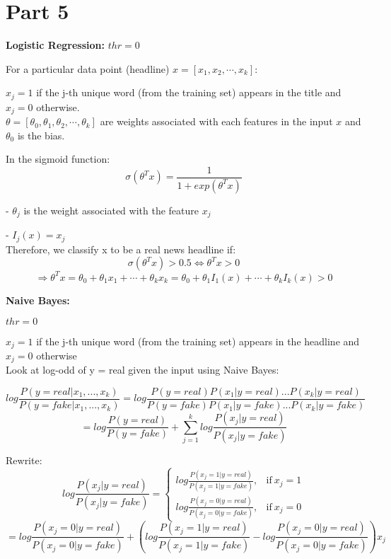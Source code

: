 \documentclass{article}
\begin{document}
\section*{Part 5}
\textbf{Logistic Regression:
}
\noindent
$thr = 0$

\noindent
For a particular data point (headline) $x = [x_1, x_2, \cdots, x_k]$:

\noindent
$x_j = 1$ if the j-th unique word (from the training set) appears in the title and $x_j = 0$ otherwise.\\

\noindent
$\theta =[\theta_0, \theta_1, \theta_2, \cdots, \theta_k]$ are weights associated with each features in the input $x$ and $\theta_0$ is the bias. 

\noindent
In the sigmoid function: $$\sigma(\theta^T x) = \frac{1}{1+exp(\theta^T x)}$$

- $\theta_j$ is the weight associated with the feature $x_j$

- $I_{j}(x) = x_j$ \\

\noindent
Therefore, we classify x to be a real news headline if:
$$\sigma(\theta^T x) > 0.5 \Leftrightarrow \theta^T x > 0$$
$$\Rightarrow \theta^T x = \theta_0 + \theta_1 x_1 + \cdots + \theta_k x_k = \theta_0 + \theta_1 I_{1}(x) + \cdots + \theta_k I_{k}(x) > 0$$

\noindent
\textbf{Naive Bayes:
}

\noindent
$thr = 0$

\noindent
$x_j = 1$ if the j-th unique word (from the training set) appears in the headline and $x_j = 0$ otherwise\\

\noindent
Look at log-odd of y = real given the input using Naive Bayes:

$$log\frac{P(y=real|x_1, ... , x_k)}{P(y=fake|x_1, ... , x_k)} = log\frac{P(y=real)P(x_1|y = real)...P(x_k|y = real)}{P(y=fake)P(x_1|y = fake)...P(x_k|y = fake)}$$
$$= log\frac{P(y=real)}{P(y=fake)} + \sum_{j=1}^{k} log\frac{P(x_j|y=real)}{P(x_j|y=fake)} $$

\noindent
Rewrite:
$$ log\frac{P(x_j|y=real)}{P(x_j|y=fake)}  =   
\begin{cases}
      log\frac{P(x_j = 1|y=real)}{P(x_j = 1|y=fake)}, & \text{if}\ x_j=1 \\
      log\frac{P(x_j = 0|y=real)}{P(x_j = 0|y=fake)}, & \text{if}\ x_j=0
\end{cases} $$
$$= log\frac{P(x_j = 0|y=real)}{P(x_j = 0|y=fake)} + (log\frac{P(x_j = 1|y=real)}{P(x_j = 1|y=fake)} - log\frac{P(x_j = 0|y=real)}{P(x_j = 0|y=fake)})x_j$$
\end{document}
